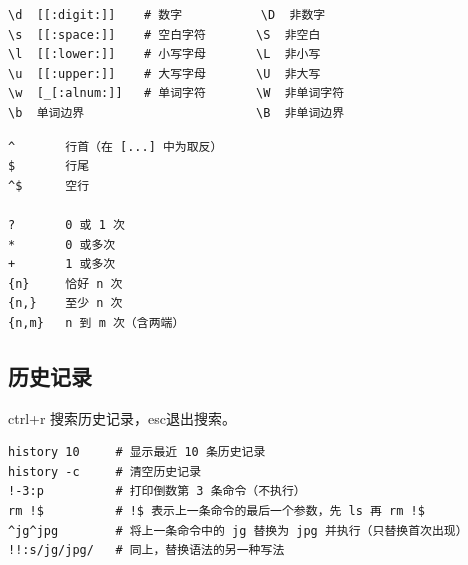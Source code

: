 \begin{code}[title=简写字符类（大写为补集）]
	\begin{verbatim}
\d  [[:digit:]]    # 数字           \D  非数字
\s  [[:space:]]    # 空白字符       \S  非空白
\l  [[:lower:]]    # 小写字母       \L  非小写
\u  [[:upper:]]    # 大写字母       \U  非大写
\w  [_[:alnum:]]   # 单词字符       \W  非单词字符
\b  单词边界                        \B  非单词边界
	\end{verbatim}
\end{code}

\begin{code}[title=锚点与量词]
	\begin{verbatim}
^       行首（在 [...] 中为取反）
$       行尾
^$      空行

?       0 或 1 次
*       0 或多次
+       1 或多次
{n}     恰好 n 次
{n,}    至少 n 次
{n,m}   n 到 m 次（含两端）
	\end{verbatim}
\end{code}

\subsection{历史记录}
ctrl+r 搜索历史记录，esc退出搜索。

\begin{code}[title=history]
	\begin{verbatim}
history 10     # 显示最近 10 条历史记录
history -c     # 清空历史记录
!-3:p          # 打印倒数第 3 条命令（不执行）
rm !$          # !$ 表示上一条命令的最后一个参数，先 ls 再 rm !$
^jg^jpg        # 将上一条命令中的 jg 替换为 jpg 并执行（只替换首次出现）
!!:s/jg/jpg/   # 同上，替换语法的另一种写法
	\end{verbatim}
\end{code}

